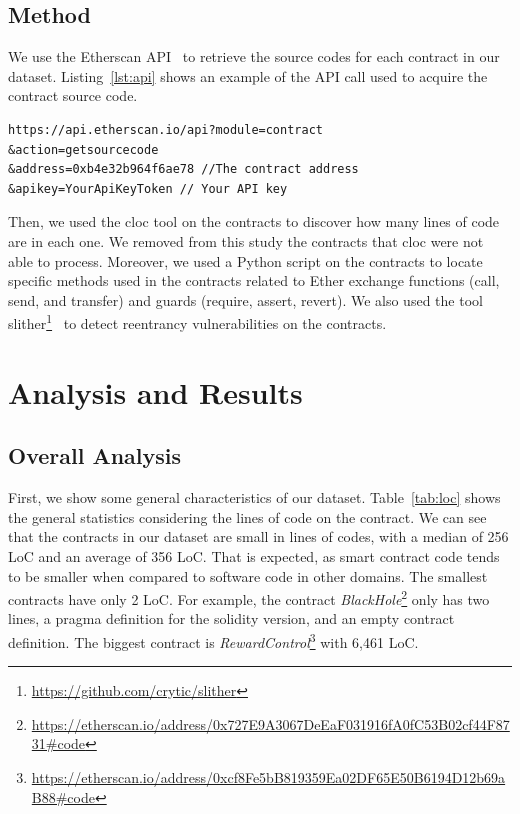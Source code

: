 \documentclass[10pt,conference]{IEEEtran}
\begin{document}
\subsection{Method}

We use the Etherscan API~\cite{etherscan_api} to retrieve the source codes for each contract in our dataset. Listing~\ref{lst:api} shows an example of the API call used to acquire the contract source code.
\begin{lstlisting}[language=solidity, caption=Etherscan API call, label={lst:api}]
https://api.etherscan.io/api?module=contract
&action=getsourcecode
&address=0xb4e32b964f6ae78 //The contract address
&apikey=YourApiKeyToken // Your API key
\end{lstlisting}

Then, we used the cloc tool on the contracts to discover how many lines of code are in each one. We removed from this study the contracts that cloc were not able to process. Moreover, we used a Python script on the contracts to locate specific methods used in the contracts related to Ether exchange functions (call, send, and transfer) and guards (require, assert, revert). We also used the tool slither\footnote{\url{https://github.com/crytic/slither}}~\cite{slither} to detect reentrancy vulnerabilities on the contracts.


\section{Analysis and Results}\label{sec:results}

\subsection{Overall Analysis}

First, we show some general characteristics of our dataset.
Table~\ref{tab:loc} shows the general statistics considering the lines of code on the contract. We can see that the contracts in our dataset are small in lines of codes, with a median of 256 LoC and an average of 356 LoC. That is expected, as smart contract code tends to be smaller when compared to software code in other domains.  The smallest contracts have only 2 LoC.  For example, the contract \textit{BlackHole}\footnote{\url{https://etherscan.io/address/0x727E9A3067DeEaF031916fA0fC53B02cf44F8731\#code}} only has two lines, a pragma definition for the solidity version, and an empty contract definition. The biggest contract is \textit{RewardControl}\footnote{\url{https://etherscan.io/address/0xcf8Fe5bB819359Ea02DF65E50B6194D12b69aB88\#code}} with 6,461 LoC. 
\end{document}
